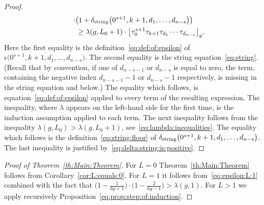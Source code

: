 \begin{proof}
\begin{gather*}
\cdot\big(1+\delta_{\rm string}\big(0^{s+1},k+1,d_1,\dots,d_{n-s}\big)\big)\\
\qquad{} \ge \lambda(g,L_0+1)
\cdot\big\lfloor\tau_0^{s+1}\tau_{k+1}\tau_{d_1}\cdots\tau_{d_{n-s}}\big\rfloor_g.
\end{gather*}
Here the first equality is the definition~\eqref{eq:def:of:epsilon} of $\epsilon\big(0^{s+1},k+1,d_1,\dots,d_{n-s}\big)$. The second equality is the string equation~\eqref{eq:string}.
(Recall that by convention, if one of $d_{n-s-1}$ or $d_{n-s}$ is equal to zero, the term, containing the negative index $d_{n-s-1}-1$ or $d_{n-s}-1$ respectively, is missing in the string equation and below.)
The equality which follows, is equation~\eqref{eq:def:of:epsilon} applied to every term of the resulting expression. The inequality, where $\lambda$ appears on the left-hand side for the first time, is the induction assumption applied to each term. The next inequality follows from the inequality $\lambda(g,L_0)>\lambda(g,L_0+1)$,
see~\eqref{eq:lambda:inequalities}. The equality which follows is the definition~\eqref{eq:string:floor} of $\delta_{\rm string}\big(0^{s+1},k+1,d_1,\dots,d_{n-s}\big)$. The last inequality is justified by~\eqref{eq:delta:string:is:positive}.
\end{proof}

\begin{proof}[Proof of Theorem~\ref{th:Main:Theorem}]
For $L=0$ Theorem~\ref{th:Main:Theorem} follows from
Corollary~\ref{cor:L:equals:0}. For $L=1$ it follows from~\eqref{eq:epsilon:L:1}
combined with the fact that $\big(1-\frac{1}{6g+1}\big)
\cdot\big(1-\frac{2}{6g-1}\big)>\lambda(g,1)$.
For $L>1$ we apply recursively Proposition~\ref{eq:prop:step:of:induction}.
\end{proof}
